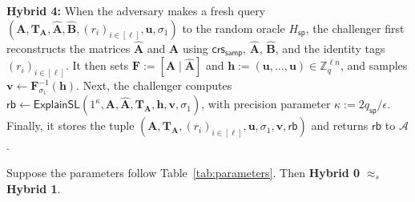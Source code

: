 \medskip
\noindent\textbf{Hybrid 4:} When the adversary makes a fresh query
\((\mathbf{A},\mathbf{T}_{\mathbf{A}},\widehat{\mathbf{A}},\widehat{\mathbf{B}},(r_i)_{i\in[\ell]},\mathbf{u},\sigma_1)\) to the random oracle \(H_{\mathsf{sp}}\), the challenger first reconstructs the matrices
\(\widehat{\mathbf{A}}\) and \(\mathbf{A}\) using
\(\mathsf{crs}_{\mathsf{samp}}\), \(\widehat{\mathbf{A}}\), \(\widehat{\mathbf{B}}\), and the identity tags
\((r_i)_{i\in[\ell]}\). It then sets
\(\mathbf{F}:=[\mathbf{A}\mid\widehat{\mathbf{A}}]\) and
\(\mathbf{h}:=(\mathbf{u},\ldots,\mathbf{u})\in\mathbb{Z}_q^{\ell n}\), and samples
\(\mathbf{v}\leftarrow \mathbf{F}_{\sigma_1}^{-1}(\mathbf{h})\).
Next, the challenger computes
\(\mathsf{rb}\gets
\mathsf{ExplainSL}(1^\kappa,\mathbf{A},\widehat{\mathbf{A}},\mathbf{T}_{\mathbf{A}},
\mathbf{h},\mathbf{v},\sigma_1)\), with precision parameter $\kappa:=2q_\mathsf{sp}/\epsilon$.
Finally, it stores the tuple
\((\mathbf{A},\mathbf{T}_{\mathbf{A}},
(r_i)_{i\in[\ell]},\mathbf{u},\sigma_1,\mathbf{v},\mathsf{rb})\)
and returns \(\mathsf{rb}\) to \(\mathcal{A}\).
\noindent\begin{lemma}
Suppose the parameters follow Table~\ref{tab:parameters}. Then
\textbf{Hybrid 0} $\approx_s$ \textbf{Hybrid 1}.
\end{lemma}

